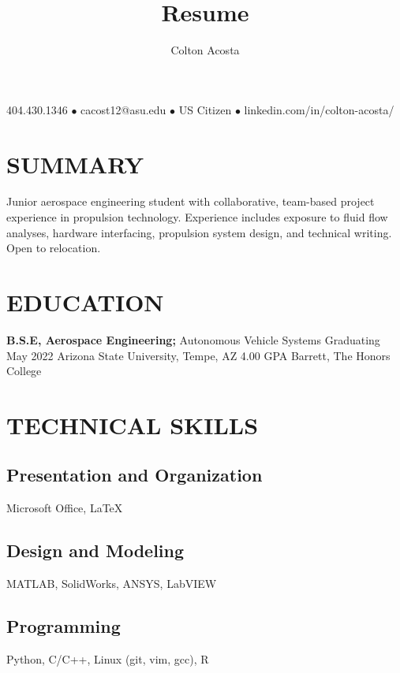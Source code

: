\documentclass{article}
\makeatletter
\renewcommand{\maketitle}{
	\begin{center}
		{\huge\bfseries
			\theauthor}
			
		404.430.1346 $\bullet$ cacost12@asu.edu $\bullet$ US Citizen $\bullet$ linkedin.com/in/colton-acosta/
	\end{center}
}
\makeatother
\begin{document}
\title{Resume}
\author{Colton Acosta}
\maketitle
\section{SUMMARY}
Junior aerospace engineering student with collaborative, team-based project experience in propulsion technology. Experience includes exposure to fluid flow analyses, hardware interfacing, propulsion system design, and technical writing. Open to relocation.
\section{EDUCATION}
\textbf{B.S.E, Aerospace Engineering;} Autonomous Vehicle Systems
\hfill 
Graduating May 2022
\linebreak
Arizona State University, Tempe, AZ 
\hfill
4.00 GPA
\linebreak
Barrett, The Honors College

\section{TECHNICAL SKILLS}
\subsection{Presentation and Organization}
Microsoft Office,  {\LaTeX}
\subsection{Design and Modeling}
MATLAB, SolidWorks, ANSYS, LabVIEW
\subsection{Programming} 
Python, C/C++, Linux (git, vim, gcc), R
\end{document}
